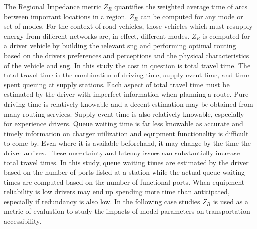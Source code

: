 The Regional Impedance metric $Z_R$ quantifies the weighted average time of arcs between important locations in a region. $Z_R$ can be computed for any mode or set of modes. For the context of road vehicles, those vehicles which must resupply energy from different networks are, in effect, different modes. $Z_R$ is computed for a driver vehicle by building the relevant \gls{sng} and performing optimal routing based on the drivers preferences and perceptions and the physical characteristics of the vehicle and \gls{sng}. In this study the cost in question is total travel time. The total travel time is the combination of driving time, supply event time, and time spent queuing at supply stations. Each aspect of total travel time must be estimated by the driver with imperfect information when planning a route. Pure driving time is relatively knowable and a decent estimation may be obtained from many routing services. Supply event time is also relatively knowable, especially for experience drivers. Queue waiting time is far less knowable as accurate and timely information on charger utilization and equipment functionality is difficult to come by. Even where it is available beforehand, it may change by the time the driver arrives. These uncertainty and latency issues can substantially increase total travel times. In this study, queue waiting times are estimated by the driver based on the number of ports listed at a station while the actual queue waiting times are computed based on the number of functional ports. When equipment reliability is low drivers may end up spending more time than anticipated, especially if redundancy is also low. In the following case studies $Z_R$ is used as a metric of evaluation to study the impacts of model parameters on transportation accessibility.